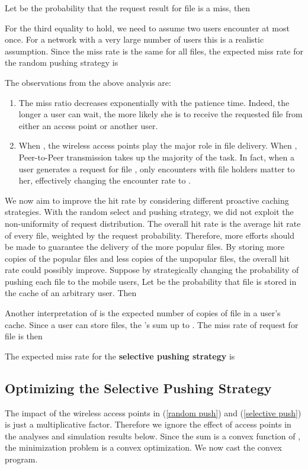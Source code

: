 \documentclass{sig-alternate}
\begin{document}
	Let  be the probability that the request result for file  is a miss, then
	


For the third equality to hold, we need to assume two users encounter at most once. For a network with a very large number of users this is a realistic assumption. Since the miss rate is the same for all files, the expected miss rate for the random pushing strategy  is



The observations from the above analysis are:
\begin{enumerate} 

	\item The miss ratio decreases exponentially with the patience time. Indeed, the longer a user can wait, the more likely she is to receive the requested file from either an access point or another user. 
	
	\item When , the wireless access points play the major role in file delivery. When , Peer-to-Peer transmission takes up the majority of the task. In fact, when a user generates a request for file , only encounters with file  holders matter to her, effectively changing the encounter rate to .
\end{enumerate}

We now aim to improve the hit rate by considering different proactive caching strategies. With the random select and pushing strategy, we did not exploit the non-uniformity of request distribution. The overall hit rate is the average hit rate of every file, weighted by the request probability. Therefore, more efforts should be made to guarantee the delivery of the more popular files. By storing more copies of the popular files and less copies of the unpopular files, the overall hit rate could possibly improve. Suppose by strategically changing the probability of pushing each file to the mobile users, Let  be the probability that file  is stored in the cache of an arbitrary user. Then

Another interpretation of  is the expected number of copies of file  in a user's cache. Since a user can store  files, the 's sum up to . The miss rate of request for file  is then



The expected miss rate for the \textbf{selective pushing strategy} is


\vspace{3mm}

\subsection{Optimizing the Selective Pushing Strategy}
The impact of the wireless access points in (\ref{random push}) and (\ref{selective push}) is just a multiplicative factor. Therefore we ignore the effect of access points in the analyses and simulation results below. Since the sum is a convex function of , the minimization problem is a convex optimization. We now cast the convex program. 
\end{document}
